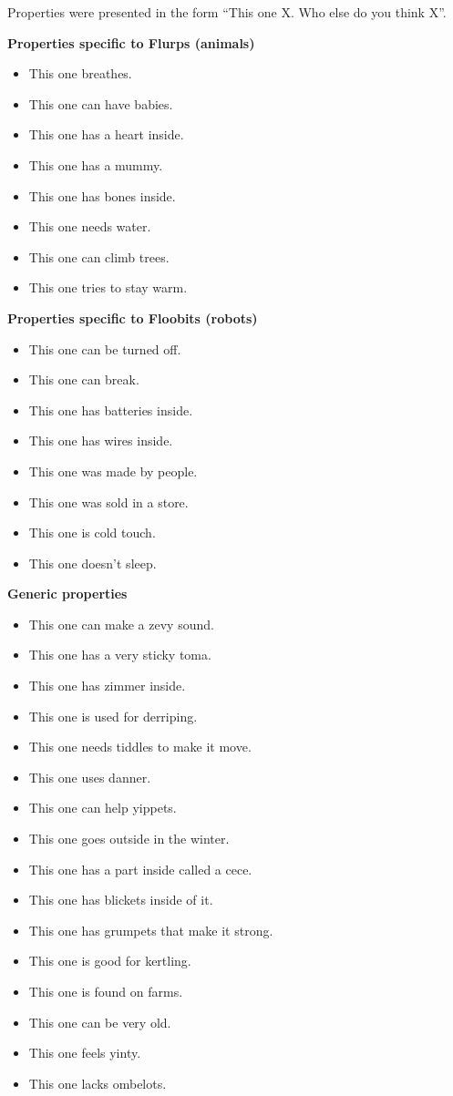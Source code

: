 
Properties were presented in the form ``This one X. Who else do you think X''.

\textbf{Properties specific to Flurps (animals)}

\begin{itemize} 
  \singlespacing
    \item This one breathes. 
    \item This one can have babies. 
    \item This one has a heart inside. 
    \item This one has a mummy. 
    \item This one has bones inside. 
    \item This one needs water. 
    \item This one can climb trees. 
    \item This one tries to stay warm. 
\end{itemize}

\textbf{Properties specific to Floobits (robots)}
\begin{itemize}
\singlespacing
    \item This one can be turned off. 
    \item This one can break. 
    \item This one has batteries inside. 
    \item This one has wires inside. 
    \item This one was made by people. 
    \item This one was sold in a store. 
    \item This one is cold touch. 
    \item This one doesn't sleep. 
\end{itemize}

\textbf{Generic properties}
\begin{itemize}
\singlespacing
    \item This one can make a zevy sound. 
    \item This one has a very sticky toma. 
    \item This one has zimmer inside. 
    \item This one is used for derriping. 
    \item This one needs tiddles to make it move. 
    \item This one uses danner. 
    \item This one can help yippets. 
    \item This one goes outside in the winter. 
    \item This one has a part inside called a cece. 
    \item This one has blickets inside of it. 
    \item This one has grumpets that make it strong. 
    \item This one is good for kertling. 
    \item This one is found on farms. 
    \item This one can be very old. 
    \item This one feels yinty. 
    \item This one lacks ombelots. 
\end{itemize}


